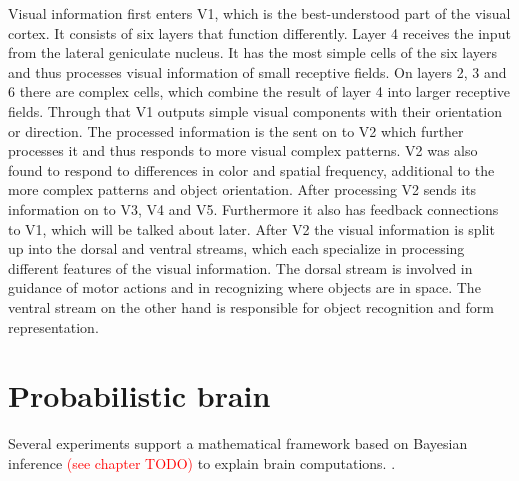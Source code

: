 Visual information first enters V1, which is the best-understood part of the visual cortex. It consists of six layers that function differently. Layer 4 receives the input from the lateral geniculate nucleus. It has the most simple cells of the six layers and thus processes visual information of small receptive fields. On layers 2, 3 and 6 there are complex cells, which combine the result of layer 4 into larger receptive fields. Through that V1 outputs simple visual components with their orientation or direction. The processed information is the sent on to V2 which further processes it and thus responds to more visual complex patterns. V2 was also found to respond to differences in color and spatial frequency, additional to the more complex patterns and object orientation. After processing V2 sends its information on to V3, V4 and V5. Furthermore it also has feedback connections to V1, which will be talked about later. After V2 the visual information is split up into the dorsal and ventral streams, which each specialize in processing different features of the visual information. The dorsal stream is involved in guidance of motor actions and in recognizing where objects are in space. The ventral stream on the other hand is responsible for object recognition and form representation.
\citep{visualCortexBook}

\section{Probabilistic brain}

Several experiments support a mathematical framework based on Bayesian inference \textcolor{red}{(see chapter TODO)} to explain brain computations. \citep{neuralSubstrate, HierachicalBayesVisualCortex, anatomyOfInference, neuralImplementationOfBayesionInferenceSensoryMotor}.

